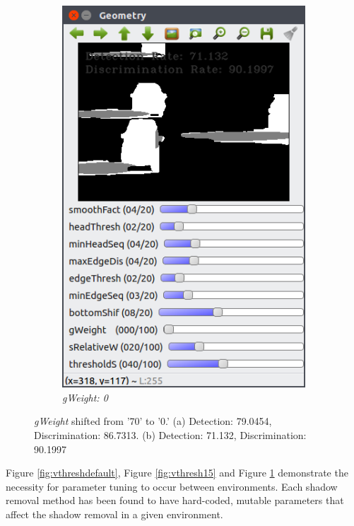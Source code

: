 \documentclass[12pt]{report}
\begin{document}
\begin{figure}
\begin{subfigure}{.49\linewidth}
    \includegraphics[width=1\linewidth]{figures/background/geo_lower_gweight.png}
    \caption{\textit{gWeight: 0}}
  \end{subfigure}
  \caption{\textit{gWeight} shifted from '70' to '0.' (a) Detection: 79.0454, Discrimination: 86.7313. (b) Detection: 71.132, Discrimination: 90.1997}
  \label{fig:gweight}
\end{figure}

Figure \ref{fig:vthreshdefault}, Figure \ref{fig:vthresh15} and Figure \ref{fig:gweight} demonstrate the necessity for parameter tuning to occur between environments. Each shadow removal method has been found to have hard-coded, mutable parameters that affect the shadow removal in a given environment.
\end{document}
